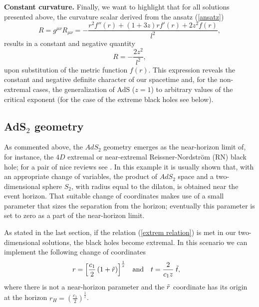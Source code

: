 \documentclass[sn-mathphys,Numbered]{sn-jnl}%
\theoremstyle{thmstyleone}%
\theoremstyle{thmstyletwo}%
\theoremstyle{thmstylethree}%
\begin{document}
\textbf{Constant curvature.} Finally, we want to highlight that for all solutions presented above, the curvature scalar derived from the ansatz (\ref{ansatz}) 
%
\begin{equation}
    R=g^{\mu \nu} R_{\mu \nu}= -\frac{r^2 f''(r)+ (1+3z)r f'(r)+2z^2 f(r)}{l^2},
\end{equation}
%
 results in a constant and negative quantity 
\begin{equation} \label{curvature}
    R= -\frac{2z^2}{l^2},
\end{equation}
 upon substitution of the metric function $f(r)$. This expression reveals the constant and negative definite character of our spacetime and, for the non-extremal cases, the generalization of AdS ($z=1$) to arbitrary values of the critical exponent (for the case of the extreme black holes see below).

\subsection{AdS$_2$ geometry}

As commented above, the $AdS_2$ geometry emerges as the near-horizon limit of, for instance, the $4D$ extremal  or near-extremal Reissner-Nordstr\"{o}m (RN) black hole; for a pair of nice reviews see \cite{Sarosi,Trunin}. In this example it is usually  shown that, with an appropriate change of variables, the product of $AdS_2$ space and a two-dimensional sphere $S_2$, with radius equal to the dilaton, is obtained near the event horizon. That suitable change of coordinates makes use of a small parameter that sizes the separation from the horizon; eventually this parameter is set to zero as a part of the near-horizon limit.

As stated in the last section, if the relation (\ref{extrem relation}) is met in our two-dimensional solutions, the black holes become extremal. In this scenario we can implement the following change of coordinates 
%
\begin{equation} \label{our change of coord}
    \begin{aligned}
    &r=\left[\frac{c_1}{2}\left(1+\Tilde{r}\right) \right]^{\frac{1}{z}} & &\text{and} & &t=\frac{2}{c_1 z}\; \Tilde{t},
    \end{aligned}
\end{equation}
%
where there is not a near-horizon parameter and the $\Tilde{r}$ coordinate has its origin at the horizon $r_H=\left(\frac{c_1}{2}\right)^{\frac{1}{z}}$.  
\end{document}
